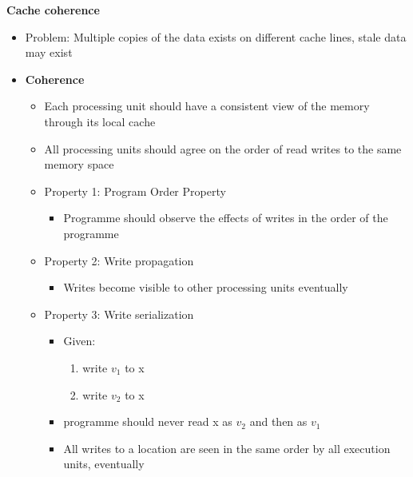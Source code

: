 \documentclass[10pt, landscape]{article}
\begin{document}
\begin{multicols}{4}
\textbf{Cache coherence}
\begin{itemize}
    \item Problem: Multiple copies of the data exists on different cache lines, stale data may exist
    \item \textbf{Coherence}
    \begin{itemize}
        \item Each processing unit should have a consistent view of the memory through its local cache 
        \item All processing units should agree on the order of read writes to the same memory space 
        \item Property 1: Program Order Property 
        \begin{itemize}
            \item Programme should observe the effects of writes in the order of the programme
        \end{itemize}
        \item Property  2: Write propagation
        \begin{itemize}
            \item Writes become visible to other processing units eventually
        \end{itemize}
        \item Property 3: Write serialization
        \begin{itemize}
            \item Given: 
            \begin{enumerate}
                \item write $v_1$ to x 
                \item write $v_2$ to x 
            \end{enumerate}
            \item programme should never read x as $v_2$ and then as $v_1$
            \item All writes to a location are seen in the same order by all execution units, eventually
        \end{itemize}
    \end{itemize}
\end{itemize}


\end{multicols}
\end{document}
